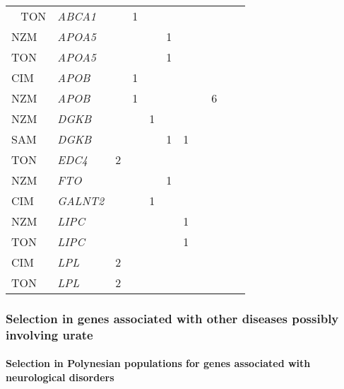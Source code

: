 \documentclass[twoside,openright]{report}
\let\oldparagraph\paragraph
\renewcommand{\paragraph}[1]{\oldparagraph{#1}\mbox{}}
\begin{document}
\begin{ThreePartTable}
\begin{longtable}[t]{lllllllllll}
\midrule
\endhead
\
\endfoot
\bottomrule
\insertTableNotes
\endlastfoot
TON & \em{ABCA1} &  & 1 &  &  &  &  &  &  & \\
NZM & \em{APOA5} &  &  &  & 1 &  &  &  &  & \\
TON & \em{APOA5} &  &  &  & 1 &  &  &  &  & \\
CIM & \em{APOB} &  & 1 &  &  &  &  &  &  & \\
NZM & \em{APOB} &  & 1 &  &  &  &  & 6 &  & \\
\addlinespace
NZM & \em{DGKB} &  &  & 1 &  &  &  &  &  & \\
SAM & \em{DGKB} &  &  &  & 1 & 1 &  &  &  & \\
TON & \em{EDC4} & 2 &  &  &  &  &  &  &  & \\
NZM & \em{FTO} &  &  &  & 1 &  &  &  &  & \\
CIM & \em{GALNT2} &  &  & 1 &  &  &  &  &  & \\
\addlinespace
NZM & \em{LIPC} &  &  &  &  & 1 &  &  &  & \\
TON & \em{LIPC} &  &  &  &  & 1 &  &  &  & \\
CIM & \em{LPL} & 2 &  &  &  &  &  &  &  & \\
TON & \em{LPL} & 2 &  &  &  &  &  &  &  & \\*
\end{longtable}
\end{ThreePartTable}

\endgroup{}

\subsubsection{Selection in genes associated with other diseases
possibly involving
urate}\label{selection-in-genes-associated-with-other-diseases-possibly-involving-urate}

\paragraph{Selection in Polynesian populations for genes associated with
neurological
disorders}\label{selection-in-polynesian-populations-for-genes-associated-with-neurological-disorders}
\end{document}
